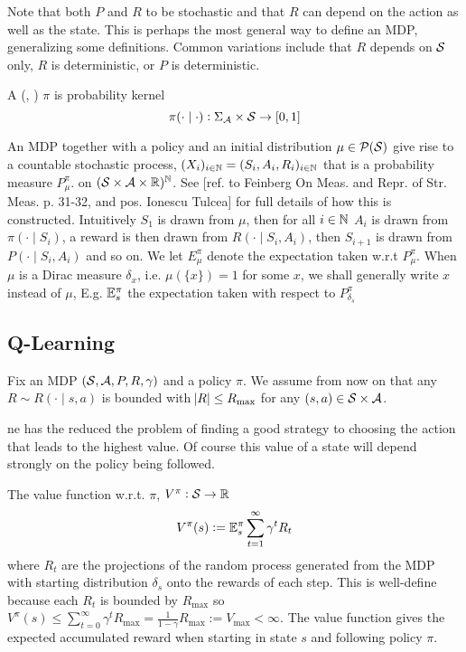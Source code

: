 Note that both $P$ and $R$ to be stochastic
and that $R$ can depend on the action as well as the state.
This is perhaps the most general way to define an MDP,
generalizing some definitions. Common variations include that
$R$ depends on $\mathcal{S}$ only,
$R$ is deterministic, or
$P$ is deterministic. %
\begin{defn}[Policy]
A (, ) 
$\pi$ is probability kernel
\[\pi(\cdot \mid \cdot) : \Sigma_{\mathcal{A}} \times \mathcal{S} \to [0,1] \]
\end{defn}

An MDP together with a policy and an initial distribution
$\mu \in \mathcal{P}(\mathcal{S})$
give rise to a countable stochastic process,
$ (X_i)_{i\in \mathbb{N}} = (S_i, A_i, R_i)_{i\in \mathbb{N}}$ 
that is a probability measure $P^\pi_\mu$. on
$(\mathcal{S} \times \mathcal{A} \times \mathbb{R})^\mathbb{N} $.
See [ref. to Feinberg On Meas. and Repr. of Str. Meas. p. 31-32,
and pos. Ionescu Tulcea] %
for full details of how this is constructed.
Intuitively $S_1$ is drawn from $\mu$,
then for all $i \in \mathbb{N}$
$A_i$ is drawn from $\pi(\cdot \mid S_i)$,
a reward is then drawn from $R(\cdot \mid S_i, A_i)$,
then $S_{i+1}$ is drawn from $P(\cdot \mid S_i, A_i)$ and so on.
We let $E^\pi_\mu$ denote the expectation taken w.r.t $P^\pi_\mu$.
When $\mu$ is a Dirac measure $\delta_x$, i.e. $\mu(\{x\}) = 1$ for some $x$,
we shall generally write $x$ instead of $\mu$,
E.g. $\mathbb{E}^\pi_s$ the expectation taken with respect to $P^\pi_{\delta_s}$

\subsection{Q-Learning}

Fix an MDP $(\mathcal{S}, \mathcal{A}, P, R, \gamma)$ and a policy $\pi$.
We assume from now on that any $R \sim R(\cdot \mid s, a)$ is bounded
with $\abs{R} \leq R_{\max}$ for any $(s,a) \in \mathcal{S} \times \mathcal{A}$.

ne has the reduced the problem of finding a good strategy
to choosing the action that leads to the
highest value. Of course this value of a state will depend
strongly on the policy being followed. 

The  value function
w.r.t. $\pi$,
$V^\pi : \mathcal{S} \to \mathbb{R}$
\[ V^\pi(s) \vcentcolon= \mathbb{E}^\pi_s \sum_{t = 1}^\infty \gamma^t R_t \]
where $R_t$ are the projections of the random process generated from the
MDP with starting distribution $\delta_s$ onto the rewards of each step.
This is well-define because each $R_t$ is bounded by $R_{\max}$ so
$V^{\pi}(s) \leq \sum_{t=0}^\infty \gamma^t R_{\max}
= \frac{1}{1-\gamma} R_{\max} := V_{\max} < \infty $.
The value function gives the expected 
accumulated reward when starting in state $s$ and following policy $\pi$.

